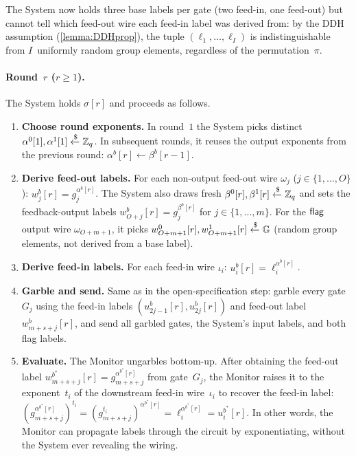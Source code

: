 The System now holds three base labels per gate (two feed-in, one feed-out) but cannot tell which feed-out wire each feed-in label was derived from: by the DDH assumption (\cref{lemma:DDHprop}), the tuple $(\ell_1,\ldots,\ell_I)$ is indistinguishable from $I$~uniformly random group elements, regardless of the permutation~$\pi$.

\paragraph{Round~$r$ ($r \geq 1$).}
The System holds $\sigma[r]$ and proceeds as follows.

\begin{enumerate}
    \item \textbf{Choose round exponents.} In round~$1$ the System picks distinct $\alpha^0[1],\alpha^1[1] \xleftarrow{\$} \mathbb{Z}_q$. In subsequent rounds, it reuses the output exponents from the previous round: $\alpha^b[r] \gets \beta^b[r{-}1]$.
    \item \textbf{Derive feed-out labels.} For each non-output feed-out wire $\omega_j$ ($j \in \{1,\ldots,O\}$):
    $w_j^b[r] = g_j^{\alpha^b[r]}$.
    The System also draws fresh $\beta^0[r],\beta^1[r] \xleftarrow{\$} \mathbb{Z}_q$ and sets the feedback-output labels $w_{O+j}^b[r] = g_j^{\beta^b[r]}$ for $j \in \{1,\ldots,m\}$. For the $\textsf{flag}$ output wire $\omega_{O+m+1}$, it picks $w_{O+m+1}^0[r],w_{O+m+1}^1[r] \xleftarrow{\$} \mathbb{G}$ (random group elements, not derived from a base label).
    \item \textbf{Derive feed-in labels.} For each feed-in wire $\iota_i$: $u_i^b[r] = \ell_i^{\alpha^b[r]}$.
    \item \textbf{Garble and send.} Same as in the open-specification step: garble every gate $G_j$ using the feed-in labels $(u_{2j-1}^b[r], u_{2j}^b[r])$ and feed-out label $w_{m+s+j}^b[r]$, and send all garbled gates, the System's input labels, and both flag labels.
    \item \textbf{Evaluate.} The Monitor ungarbles bottom-up. After obtaining the feed-out label $w_{m+s+j}^{b^*}[r] = g_{m+s+j}^{\alpha^{b^*}[r]}$ from gate~$G_j$, the Monitor raises it to the exponent~$t_i$ of the downstream feed-in wire~$\iota_i$ to recover the feed-in label: $(g_{m+s+j}^{\alpha^{b^*}[r]})^{t_i} = (g_{m+s+j}^{t_i})^{\alpha^{b^*}[r]} = \ell_i^{\alpha^{b^*}[r]} = u_i^{b^*}[r]$. In other words, the Monitor can propagate labels through the circuit by exponentiating, without the System ever revealing the wiring.
\end{enumerate}

